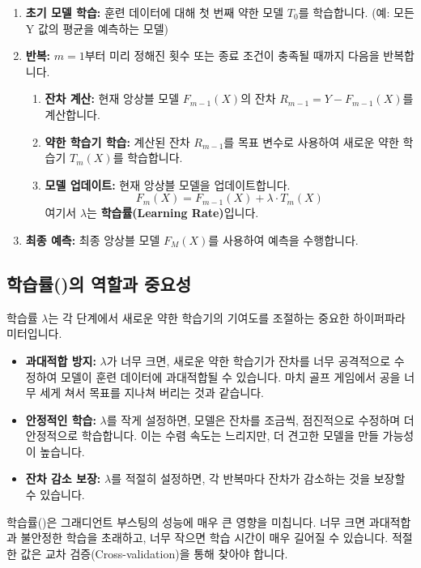 \documentclass[11pt,a4paper]{article}
\theoremstyle{definition}
\begin{document}
\begin{enumerate}
    \item \textbf{초기 모델 학습:} 훈련 데이터에 대해 첫 번째 약한 모델 $T_0$를 학습합니다. (예: 모든 Y 값의 평균을 예측하는 모델)
    \item \textbf{반복:} $m=1$부터 미리 정해진 횟수 또는 종료 조건이 충족될 때까지 다음을 반복합니다.
    \begin{enumerate}
        \item \textbf{잔차 계산:} 현재 앙상블 모델 $F_{m-1}(X)$의 잔차 $R_{m-1} = Y - F_{m-1}(X)$를 계산합니다.
        \item \textbf{약한 학습기 학습:} 계산된 잔차 $R_{m-1}$를 목표 변수로 사용하여 새로운 약한 학습기 $T_m(X)$를 학습합니다.
        \item \textbf{모델 업데이트:} 현재 앙상블 모델을 업데이트합니다.
        \[ F_m(X) = F_{m-1}(X) + \lambda \cdot T_m(X) \]
        여기서 $\lambda$는 \textbf{학습률(Learning Rate)}입니다.
    \end{enumerate}
    \item \textbf{최종 예측:} 최종 앙상블 모델 $F_M(X)$를 사용하여 예측을 수행합니다.
\end{enumerate}

\subsection{학습률(\texttt{\lambda})의 역할과 중요성}
학습률 $\lambda$는 각 단계에서 새로운 약한 학습기의 기여도를 조절하는 중요한 하이퍼파라미터입니다.

\begin{itemize}
    \item \textbf{과대적합 방지:} $\lambda$가 너무 크면, 새로운 약한 학습기가 잔차를 너무 공격적으로 수정하여 모델이 훈련 데이터에 과대적합될 수 있습니다. 마치 골프 게임에서 공을 너무 세게 쳐서 목표를 지나쳐 버리는 것과 같습니다.
    \item \textbf{안정적인 학습:} $\lambda$를 작게 설정하면, 모델은 잔차를 조금씩, 점진적으로 수정하며 더 안정적으로 학습합니다. 이는 수렴 속도는 느리지만, 더 견고한 모델을 만들 가능성이 높습니다.
    \item \textbf{잔차 감소 보장:} $\lambda$를 적절히 설정하면, 각 반복마다 잔차가 감소하는 것을 보장할 수 있습니다.
\end{itemize}

\begin{tcolorbox}[importantbox, title={학습률(\texttt{\lambda})의 중요성}] %
학습률(\texttt{\lambda})은 그래디언트 부스팅의 성능에 매우 큰 영향을 미칩니다. 너무 크면 과대적합과 불안정한 학습을 초래하고, 너무 작으면 학습 시간이 매우 길어질 수 있습니다. 적절한 \texttt{\lambda} 값은 교차 검증(Cross-validation)을 통해 찾아야 합니다.
\end{tcolorbox}
\end{document}
